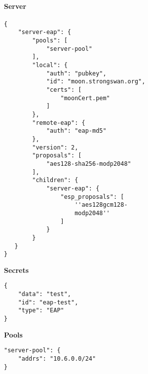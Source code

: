 \begin{minipage}[t]{0.5\textwidth}
\vspace{0pt}
\paragraph{Server}\mbox{}\medskip
\begin{lstlisting}[style=BashInputStyle]
{
    "server-eap": {
        "pools": [
            "server-pool"
        ],
        "local": {
            "auth": "pubkey",
            "id": "moon.strongswan.org",
            "certs": [
                "moonCert.pem"
            ]
        },
        "remote-eap": {
            "auth": "eap-md5"
        },
        "version": 2,
        "proposals": [
            "aes128-sha256-modp2048"
        ],
        "children": {
            "server-eap": {
                "esp_proposals": [
                    ''aes128gcm128-
                    modp2048''
                ]
            }
        }
   }
}
\end{lstlisting}
\hspace*{18pt}\textbf{Secrets}\mbox{}\medskip
\begin{lstlisting}[style=BashInputStyle]
{
    "data": "test",
    "id": "eap-test",
    "type": "EAP"
}
\end{lstlisting}
\hspace*{18pt}\textbf{Pools}\mbox{}\medskip
\begin{lstlisting}[style=BashInputStyle]
"server-pool": {
    "addrs": "10.6.0.0/24"
}
\end{lstlisting}
\end{minipage}


